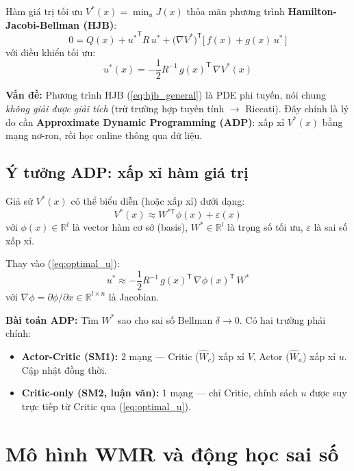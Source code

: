 \documentclass[12pt,a4paper]{article}
\newcommand{\R}{\mathbb{R}}
\newcommand{\T}{\mathsf{T}}
\begin{document}
Hàm giá trị tối ưu $V^*(x) = \min_u J(x)$ thỏa mãn phương trình \textbf{Hamilton-Jacobi-Bellman (HJB)}:
\begin{equation}\label{eq:hjb_general}
    \boxed{0 = Q(x) + {u^*}^\T R\, u^* + \big(\nabla V^*\big)^\T \big[\,f(x) + g(x)\, u^*\,\big]}
\end{equation}
với điều khiển tối ưu:
\begin{equation}\label{eq:optimal_u}
    u^*(x) = -\frac{1}{2} R^{-1}\, g(x)^\T\, \nabla V^*(x)
\end{equation}

\textbf{Vấn đề:} Phương trình HJB (\ref{eq:hjb_general}) là PDE phi tuyến, nói chung \textit{không giải được giải tích} (trừ trường hợp tuyến tính $\to$ Riccati). Đây chính là lý do cần \textbf{Approximate Dynamic Programming (ADP)}: xấp xỉ $V^*(x)$ bằng mạng nơ-ron, rồi học online thông qua dữ liệu.

\subsection{Ý tưởng ADP: xấp xỉ hàm giá trị}

Giả sử $V^*(x)$ có thể biểu diễn (hoặc xấp xỉ) dưới dạng:
\begin{equation}\label{eq:value_approx}
    V^*(x) \approx W^{*\T} \phi(x) + \varepsilon(x)
\end{equation}
với $\phi(x) \in \R^l$ là vector hàm cơ sở (basis), $W^* \in \R^l$ là trọng số tối ưu, $\varepsilon$ là sai số xấp xỉ.

Thay vào (\ref{eq:optimal_u}):
\begin{equation}
    u^* \approx -\frac{1}{2} R^{-1}\, g(x)^\T\, \nabla\phi(x)^\T\, W^*
\end{equation}
với $\nabla\phi = \partial\phi/\partial x \in \R^{l \times n}$ là Jacobian.

\textbf{Bài toán ADP:} Tìm $W^*$ sao cho sai số Bellman $\delta \to 0$. Có hai trường phái chính:
\begin{itemize}
    \item \textbf{Actor-Critic (SM1):} 2 mạng --- Critic ($\hat{W}_c$) xấp xỉ $V$, Actor ($\hat{W}_a$) xấp xỉ $u$. Cập nhật đồng thời.
    \item \textbf{Critic-only (SM2, luận văn):} 1 mạng --- chỉ Critic, chính sách $u$ được suy trực tiếp từ Critic qua (\ref{eq:optimal_u}).
\end{itemize}

\section{Mô hình WMR và động học sai số}
\end{document}
